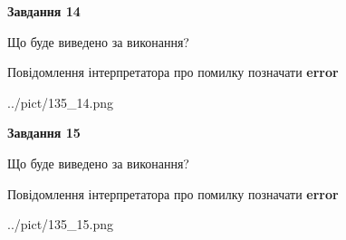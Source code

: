 \documentclass[11pt, ukrainian]{article}
\begin{document}
{\begin {large}
{\begin {center}\textbf{Завдання 14}\end {center}}\par
Що буде виведено за виконання? \par
Повідомлення інтерпретатора про помилку позначати \textbf{error}

\begin{center}
	{../pict/135_14.png}
\end{center}
\newpage

{\begin {center}\textbf{Завдання 15}\end {center}}\par
Що буде виведено за виконання? \par
Повідомлення інтерпретатора про помилку позначати \textbf{error}

\begin{center}
	{../pict/135_15.png}
\end{center}
\newpage

\end {large}}
\end{document}
